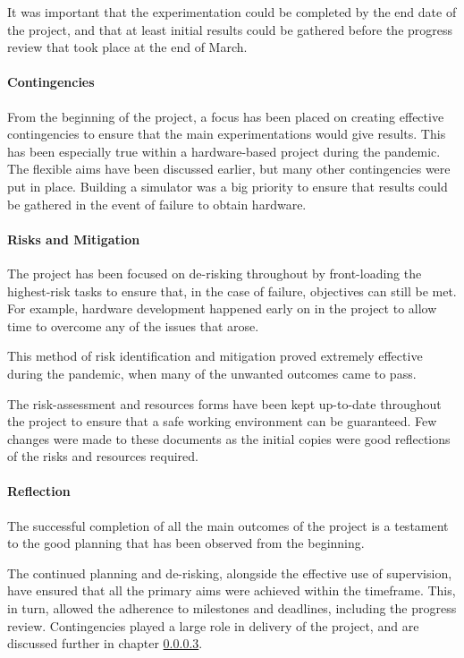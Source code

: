 It was important that the experimentation could be completed by the end date of the project, and that at least initial results could be gathered before the progress review that took place at the end of March.

\paragraph{Contingencies}
From the beginning of the project, a focus has been placed on creating effective contingencies to ensure that the main experimentations would give results. This has been especially true within a hardware-based project during the pandemic. The flexible aims have been discussed earlier, but many other contingencies were put in place. Building a simulator was a big priority to ensure that results could be gathered in the event of failure to obtain hardware.

\paragraph{Risks and Mitigation}
The project has been focused on de-risking throughout by front-loading the highest-risk tasks to ensure that, in the case of failure, objectives can still be met. For example, hardware development happened early on in the project to allow time to overcome any of the issues that arose.

This method of risk identification and mitigation proved extremely effective during the pandemic, when many of the unwanted outcomes came to pass.

The risk-assessment and resources forms have been kept up-to-date throughout the project to ensure that a safe working environment can be guaranteed. Few changes were made to these documents as the initial copies were good reflections of the risks and resources required.

\paragraph{Reflection}
The successful completion of all the main outcomes of the project is a testament to the good planning that has been observed from the beginning.

The continued planning  and de-risking, alongside the effective use of supervision, have ensured that all the primary aims were achieved within the timeframe. This, in turn, allowed the adherence to milestones and deadlines, including the progress review. Contingencies played a large role in delivery of the project, and are discussed further in chapter \ref{}.

